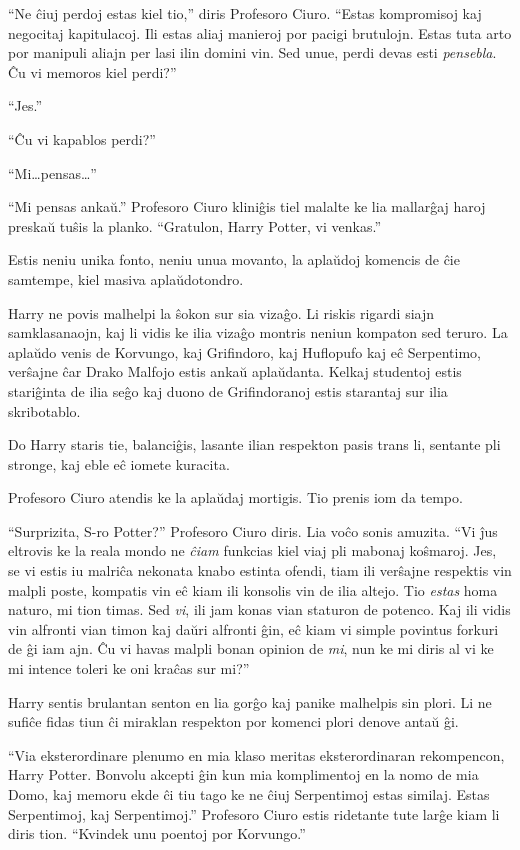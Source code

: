 ``Ne ĉiuj perdoj estas kiel tio,'' diris Profesoro Ciuro. ``Estas
kompromisoj kaj negocitaj kapitulacoj. Ili estas aliaj manieroj por
pacigi brutulojn. Estas tuta arto por manipuli aliajn per lasi ilin
domini vin. Sed unue, perdi devas esti \emph{pensebla}. Ĉu vi memoros
kiel perdi?''

``Jes.''

``Ĉu vi kapablos perdi?''

``Mi\ldots pensas\ldots''

``Mi pensas ankaŭ.'' Profesoro Ciuro kliniĝis tiel malalte ke lia
mallarĝaj haroj preskaŭ tuŝis la planko. ``Gratulon, Harry Potter, vi
venkas.''

Estis neniu unika fonto, neniu unua movanto, la aplaŭdoj komencis de
ĉie samtempe, kiel masiva aplaŭdotondro.

Harry ne povis malhelpi la ŝokon sur sia vizaĝo. Li riskis rigardi
siajn samklasanaojn, kaj li vidis ke ilia vizaĝo montris neniun
kompaton sed teruro. La aplaŭdo venis de Korvungo, kaj Grifindoro, kaj
Huflopufo kaj eĉ Serpentimo, verŝajne ĉar Drako Malfojo estis ankaŭ
aplaŭdanta. Kelkaj studentoj estis stariĝinta de ilia seĝo kaj duono
de Grifindoranoj estis starantaj sur ilia skribotablo.

Do Harry staris tie, balanciĝis, lasante ilian respekton pasis trans
li, sentante pli stronge, kaj eble eĉ iomete kuracita.

Profesoro Ciuro atendis ke la aplaŭdaj mortigis. Tio prenis iom da tempo.

``Surprizita, S-ro Potter?'' Profesoro Ciuro diris. Lia voĉo sonis
amuzita. ``Vi ĵus eltrovis ke la reala mondo ne \emph{ĉiam} funkcias
kiel viaj pli mabonaj koŝmaroj. Jes, se vi estis iu malriĉa nekonata
knabo estinta ofendi, tiam ili verŝajne respektis vin malpli poste,
kompatis vin eĉ kiam ili konsolis vin de ilia altejo. Tio \emph{estas}
homa naturo, mi tion timas. Sed \emph{vi}, ili jam konas vian staturon
de potenco. Kaj ili vidis vin alfronti vian timon kaj daŭri alfronti
ĝin, eĉ kiam vi simple povintus forkuri de ĝi iam ajn. Ĉu vi havas
malpli bonan opinion de \emph{mi}, nun ke mi diris al vi ke mi intence
toleri ke oni kraĉas sur mi?''

Harry sentis brulantan senton en lia gorĝo kaj panike malhelpis sin
plori. Li ne sufiĉe fidas tiun ĉi miraklan respekton por komenci plori
denove antaŭ ĝi.

``Via eksterordinare plenumo en mia klaso meritas eksterordinaran
rekompencon, Harry Potter. Bonvolu akcepti ĝin kun mia komplimentoj en
la nomo de mia Domo, kaj memoru ekde ĉi tiu tago ke ne ĉiuj
Serpentimoj estas similaj. Estas Serpentimoj, kaj Serpentimoj.''
Profesoro Ciuro estis ridetante tute larĝe kiam li diris
tion. ``Kvindek unu poentoj por Korvungo.''

